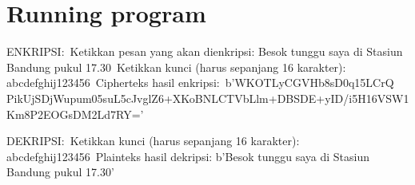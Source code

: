 \documentclass{article}
\begin{document}

\section*{Running program}

ENKRIPSI:\
Ketikkan pesan yang akan dienkripsi: Besok tunggu saya di Stasiun Bandung pukul 17.30\
Ketikkan kunci (harus sepanjang 16 karakter): abcdefghij123456\
Cipherteks hasil enkripsi:\
b'WKOTLyCGVHb8sD0q15LCrQ PikUjSDjWupum05suL5cJvglZ6+XKoBNLCTVbLlm+DBSDE+yID/i5H16VSW1Km8P\nOeoqOSzi2EOGsDM2Ld7RY='\

DEKRIPSI:\
Ketikkan kunci (harus sepanjang 16 karakter): abcdefghij123456\
Plainteks hasil dekripsi: b'Besok tunggu saya di Stasiun Bandung pukul 17.30'
\end{document}
